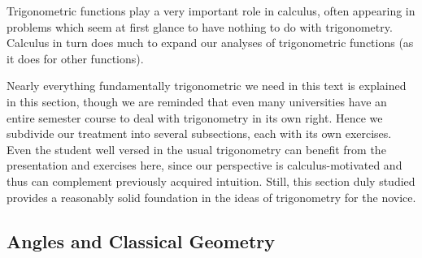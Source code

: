 Trigonometric functions play a very important role in
calculus, often appearing  in problems which seem at first glance
to have nothing to do with trigonometry. 
Calculus in turn does much to expand our analyses of
trigonometric functions (as it does for other functions).  

Nearly everything
fundamentally trigonometric we need in this text is 
explained in this section, though we are reminded that even many 
universities have an entire semester course to deal
with trigonometry in its own right.\footnotemark
 Hence we 
subdivide our treatment into several subsections, each 
with its own exercises.  Even the student well versed
in the usual trigonometry can benefit from the presentation
and exercises here, since our perspective is calculus-motivated
and thus can complement previously acquired intuition.
Still, this section duly studied provides a reasonably solid
foundation in the ideas of trigonometry for the novice.

\subsection{Angles and Classical Geometry}

